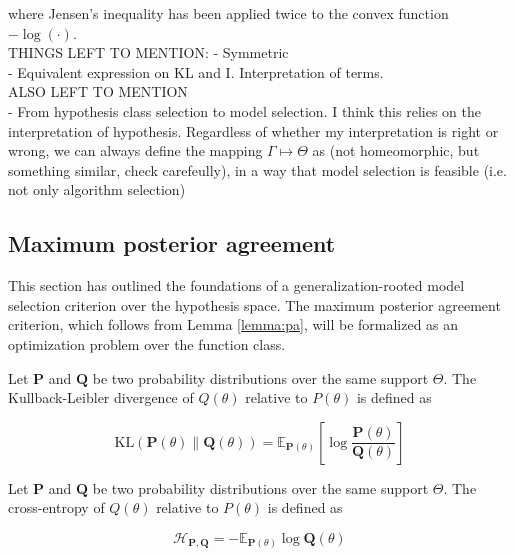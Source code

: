 where Jensen's inequality has been applied twice to the convex function $-\log(\cdot)$. \\

THINGS LEFT TO MENTION:
- Symmetric \\
- Equivalent expression on KL and I. Interpretation of terms. \\

ALSO LEFT TO MENTION \\
- From hypothesis class selection to model selection. I think this relies on the
interpretation of hypothesis. Regardless of whether my interpretation is right or wrong, we
can always define the mapping $\Gamma \longmapsto \Theta$ as (not homeomorphic, but
something similar, check carefeully), in a way that model selection is feasible (i.e. not
only algorithm selection)

\subsection{Maximum posterior agreement}

This section has outlined the foundations of a generalization-rooted model selection criterion
over the hypothesis space. The maximum posterior agreement criterion, which follows 
from Lemma \ref{lemma:pa}, will be formalized as an optimization problem over the 
function class.

\begin{definition}
    Let $\mathbf{P}$ and $\mathbf{Q}$ be two probability distributions over the same support $\Theta$. 
    The Kullback-Leibler divergence of $Q(\theta)$ relative to $P(\theta)$ is defined as

    $$
    \text{KL}(\mathbf{P}(\theta) \parallel \mathbf{Q}(\theta)) = \mathbb{E}_{\mathbf{P}(\theta)} \left[ \log \frac{\mathbf{P}(\theta)}{\mathbf{Q}(\theta)} \right]
    $$

\end{definition} 

\begin{definition}
    Let $\mathbf{P}$ and $\mathbf{Q}$ be two probability distributions over the same support $\Theta$. 
    The cross-entropy of $Q(\theta)$ relative to $P(\theta)$ is defined as

    $$
    \mathcal{H}_{\mathbf{P}, \mathbf{Q}} = - \mathbb{E}_{\mathbf{P}(\theta)} \log \mathbf{Q}(\theta)
    $$

\end{definition}

